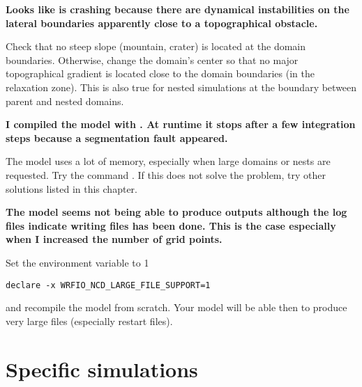 \sk
\noindent \textbf{Looks like  is crashing because there are dynamical instabilities on the lateral boundaries apparently close to a topographical obstacle.}
\begin{finger}
\item Check that no steep slope (mountain, crater) is located at the domain boundaries. Otherwise, change the domain's center so that no major topographical gradient is located close to the domain boundaries (in the relaxation zone). This is also true for nested simulations at the boundary between parent and nested domains.
\end{finger}

\sk
\noindent \textbf{I compiled the model with . At runtime it stops after a few integration steps because a segmentation fault appeared.}
\begin{finger}
\item The model uses a lot of memory, especially when large domains or nests are requested. Try the command . If this does not solve the problem, try other solutions listed in this chapter.
\end{finger}

\sk
\noindent \textbf{The model seems not being able to produce outputs although the log files indicate writing files has been done. This is the case especially when I increased the number of grid points.}
\begin{finger}
\item Set the environment variable  to 1
\begin{verbatim}
declare -x WRFIO_NCD_LARGE_FILE_SUPPORT=1
\end{verbatim}
and recompile the model from scratch. Your model will be able then to produce very large files (especially restart files).
\end{finger}

\mk
\section{Specific simulations}

